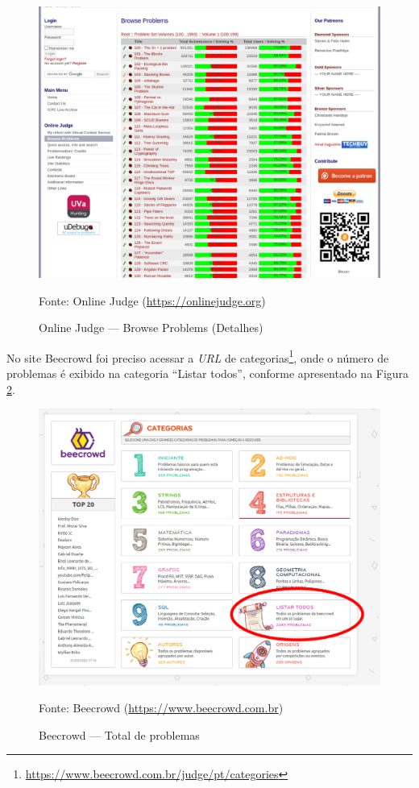 \begin{figure}
    \centering
    \caption{Online Judge — Browse Problems (Detalhes)}
    \includegraphics[keepaspectratio=true,scale=0.32]{figuras/online_judge_2.eps}
    \label{fig:online_judge_2}
    
    \medskip
    Fonte: Online Judge (\url{https://onlinejudge.org})
    \medskip
    
\end{figure}

No site Beecrowd foi preciso acessar a \textit{URL} de categorias\footnote{\url{https://www.beecrowd.com.br/judge/pt/categories}}, onde o número de problemas é exibido na categoria ``Listar todos'', conforme apresentado na Figura \ref{fig:beecrowd_1}.

\begin{figure}
    \centering
    \caption{Beecrowd — Total de problemas}
    \includegraphics[keepaspectratio=true,scale=0.4]{figuras/beecrowd_1.eps}
    \label{fig:beecrowd_1}
    
    \medskip
    Fonte: Beecrowd (\url{https://www.beecrowd.com.br})
    \medskip
\end{figure}

